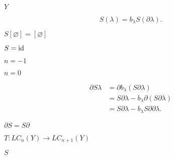 \documentclass[10pt]{book}
\begin{document}
\begin{mdSnippets}
\begin{mdInlineSnippet}[57cec4137b614c87cb4e24a3d003a3e0]%
$Y$\end{mdInlineSnippet}%
\begin{mdDisplaySnippet}[c4223b63070774c8c519f4f8ef80fde6]%
\[%
S(\lambda) = b_\lambda S(\partial \lambda).
\]%
\end{mdDisplaySnippet}%
\begin{mdInlineSnippet}[ca4f7148e09712d6ec2f25893d7c1ebf]%
$S[\varnothing] = [\varnothing]$\end{mdInlineSnippet}%
\begin{mdInlineSnippet}[bc59d209a5b3ab859258dfcd9d7ae7b2]%
$S = \operatorname{id}$\end{mdInlineSnippet}%
\begin{mdInlineSnippet}[c10b30af2ca82b997c02b71a76e1d330]%
$n=-1$\end{mdInlineSnippet}%
\begin{mdInlineSnippet}[0e1176caf07d2ed21c19fc899be7e7df]%
$n=0$\end{mdInlineSnippet}%
\begin{mdDisplaySnippet}[13d376b82c163da5de15b99bce97e57b]%
\[%
\begin{aligned}
\partial S \lambda &= \partial b_\lambda (S \partial \lambda) \\
&= S \partial \lambda - b_\lambda \partial (S \partial \lambda) \\
&= S \partial \lambda - b_\lambda S \partial \partial \lambda.
\end{aligned}
\]%
\end{mdDisplaySnippet}%
\begin{mdInlineSnippet}[0d09d5db3928f15e95c273466db302af]%
$\partial S = S \partial$\end{mdInlineSnippet}%
\begin{mdInlineSnippet}[57e8d00c81a5e01fc6dc74de2ed2a018]%
$T: LC_n(Y) \to LC_{n+1}(Y)$\end{mdInlineSnippet}%
\begin{mdInlineSnippet}%
$S$\end{mdInlineSnippet}%
\begin{mdInlineSnippet}[38249f538b50785967877e7c5400afb8]%

\end{mdInlineSnippet}
\end{mdSnippets}
\end{document}
